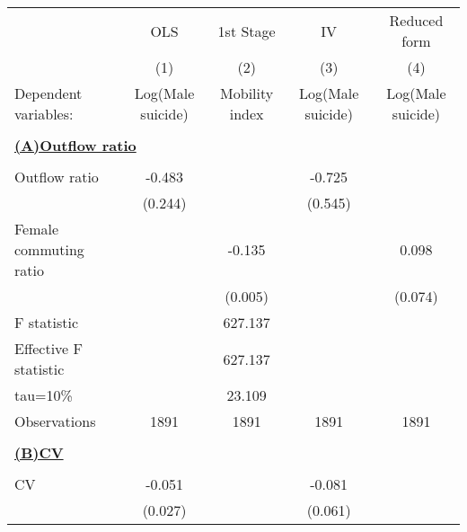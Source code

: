 \begin{tabular}{l*{4}{c}} \toprule
                    &\multicolumn{1}{c}{OLS}&\multicolumn{1}{c}{1st Stage}&\multicolumn{1}{c}{IV}&\multicolumn{1}{c}{Reduced form}\\\cmidrule(lr){2-2}\cmidrule(lr){3-3}\cmidrule(lr){4-4}\cmidrule(lr){5-5}
                    &\multicolumn{1}{c}{(1)}         &\multicolumn{1}{c}{(2)}         &\multicolumn{1}{c}{(3)}         &\multicolumn{1}{c}{(4)}         \\
Dependent variables: &Log(Male suicide)         &Mobility index         &Log(Male suicide)         &Log(Male suicide)         \\
\hline \\ \multicolumn{5}{l}{\textbf{\underline{(A)Outflow ratio}}} \\\\[-1ex]
Outflow ratio       &      -0.483\sym{**} &                     &      -0.725         &                     \\
                    &     (0.244)         &                     &     (0.545)         &                     \\
\addlinespace
Female commuting ratio&                     &      -0.135\sym{***}&                     &       0.098         \\
                    &                     &     (0.005)         &                     &     (0.074)         \\
\midrule
F statistic         &                     &     627.137         &                     &                     \\
Effective F statistic&                     &     627.137         &                     &                     \\
tau=10\%            &                     &      23.109         &                     &                     \\
Observations        &        1891         &        1891         &        1891         &        1891         \\
\hline \\ \multicolumn{5}{l}{\textbf{{\underline{(B)CV}}}} \\\\[-1ex]
CV                  &      -0.051\sym{*}  &                     &      -0.081         &                     \\
                    &     (0.027)         &                     &     (0.061)         &                     \\

\end{tabular}
